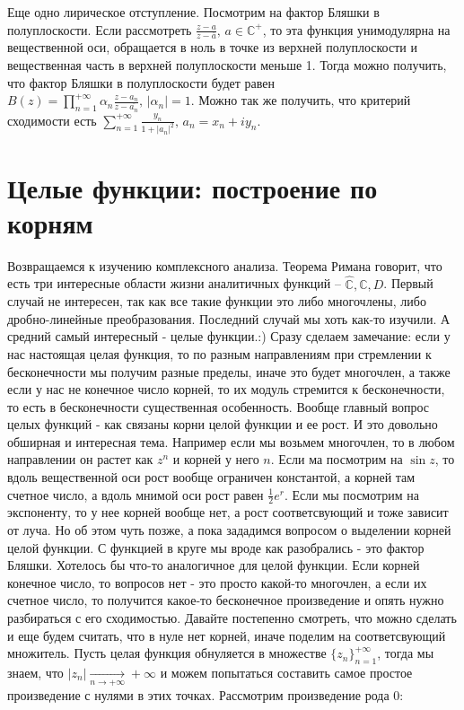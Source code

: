 \documentclass[12pt,a4paper]{article} %
\newcommand{\Co}{\mathbb{C}}
\begin{document}
	Еще одно лирическое отступление. Посмотрим на фактор Бляшки в полуплоскости. Если рассмотреть $\frac{z-a}{z-\overline{a}},\,a\in\Co^{+}$, то эта функция унимодулярна на вещественной оси, обращается в ноль в точке из верхней полуплоскости и вещественная часть в верхней полуплоскости меньше 1. Тогда можно получить, что фактор Бляшки в полуплоскости будет равен $B(z)=\displaystyle\prod_{n=1}^{+\infty}\alpha_n\frac{z-a_n}{z-\overline{a_n}},\,|\alpha_n|=1$. Можно так же получить, что критерий сходимости есть $\displaystyle\sum_{n=1}^{+\infty}\frac{y_n}{1+|a_n|^2},\,a_n=x_n+iy_n$.
	\section{Целые функции: построение по корням}
	Возвращаемся к изучению комплексного анализа. Теорема Римана говорит, что есть три интересные области жизни аналитичных функций -- $\widehat{\Co},\Co,D$. Первый случай не интересен, так как все такие функции это либо многочлены, либо дробно-линейные преобразования. Последний случай мы хоть как-то изучили. А средний самый интересный - целые функции.:) Сразу сделаем замечание: если у нас настоящая целая функция, то по разным направлениям при стремлении к бесконечности мы получим разные пределы, иначе это будет многочлен, а также если у нас не конечное число корней, то их модуль стремится к бесконечности, то есть в бесконечности существенная особенность. Вообще главный вопрос целых функций - как связаны корни целой функции и ее рост. И это довольно обширная и интересная тема. Например если мы возьмем многочлен, то в любом направлении он растет как $z^n$ и корней у него $n$. Если ма посмотрим на $\sin z$, то вдоль вещественной оси рост вообще ограничен константой, а корней там счетное число, а вдоль мнимой оси рост равен $\frac{1}{2}e^r$. Если мы посмотрим на экспоненту, то у нее корней вообще нет, а рост соответсвующий и тоже зависит от луча. Но об этом чуть позже, а пока зададимся вопросом о выделении корней целой функции. С функцией в круге мы вроде как разобрались - это фактор Бляшки. Хотелось бы что-то аналогичное для целой функции. Если корней конечное число, то вопросов нет - это просто какой-то многочлен, а если их счетное число, то получится какое-то бесконечное произведение и опять нужно разбираться с его сходимостью. Давайте постепенно смотреть, что можно сделать и еще будем считать, что в нуле нет корней, иначе поделим на соответсвующий множитель. Пусть целая функция обнуляется в множестве $\{z_n\}_{n=1}^{+\infty}$, тогда мы знаем, что $|z_n|\xrightarrow[n\rightarrow+\infty]{} +\infty$ и можем попытаться составить самое простое произведение с нулями в этих точках. Рассмотрим произведение рода 0:
\end{document}
